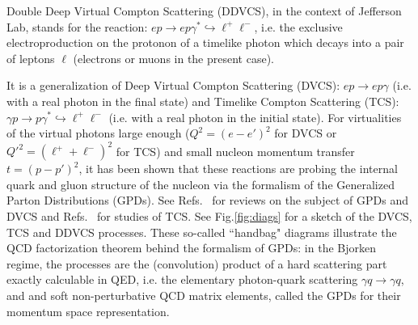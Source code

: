 
%

Double Deep Virtual Compton Scattering (DDVCS), in the context
of Jefferson Lab, stands for the reaction:
$ep\to ep\gamma^*\hookrightarrow \ell^+\ell^-$, i.e. the exclusive
electroproduction on the protonon of a 
timelike photon which decays into a pair of leptons $\ell$
(electrons or muons in the present case). 

It is a generalization of Deep Virtual Compton Scattering (DVCS):
$ep\to ep\gamma$ (i.e. with a real photon in the final state)
and Timelike Compton Scattering (TCS): 
$\gamma p\to p\gamma^*\hookrightarrow \ell^+\ell^-$
(i.e. with a real photon in the initial state). For virtualities 
of the virtual photons large enough ($Q^2=(e-e')^2$ for DVCS
or $Q'^2=(\ell^++\ell^-)^2$ for TCS) and small nucleon
momentum transfer $t=(p-p')^2$, it has been 
shown that these reactions are probing the
internal quark and gluon structure of the nucleon via
the formalism of the Generalized Parton Distributions (GPDs).
See Refs.~\cite{goeke,revdiehl,revrady,rpp} for reviews on the subject
of GPDs and DVCS and Refs.~\cite{Berger:2001xd,Goritschnig,Boer:2015hma}
for studies of TCS. See Fig.\ref{fig:diags} for a sketch of the
DVCS, TCS and DDVCS processes. These so-called ``handbag" diagrams
illustrate the QCD factorization theorem behind the formalism
of GPDs: in the Bjorken regime, the processes are the (convolution) product
of a hard scattering part exactly calculable in QED, i.e. the
elementary photon-quark scattering $\gamma q\to\gamma q$, and
and soft non-perturbative QCD matrix elements, called the GPDs
for their momentum space representation.

